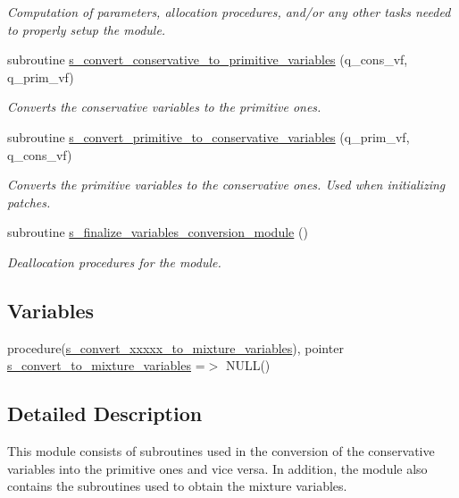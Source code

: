 \begin{DoxyCompactItemize}
\begin{DoxyCompactList}\small\item\em Computation of parameters, allocation procedures, and/or any other tasks needed to properly setup the module. \end{DoxyCompactList}\item 
subroutine \hyperlink{namespacem__variables__conversion_a589fffc2fe084855ea9e86935f1916b1}{s\+\_\+convert\+\_\+conservative\+\_\+to\+\_\+primitive\+\_\+variables} (q\+\_\+cons\+\_\+vf, q\+\_\+prim\+\_\+vf)
\begin{DoxyCompactList}\small\item\em Converts the conservative variables to the primitive ones. \end{DoxyCompactList}\item 
subroutine \hyperlink{namespacem__variables__conversion_a63d50d6771031b79117f2aba60e0cca3}{s\+\_\+convert\+\_\+primitive\+\_\+to\+\_\+conservative\+\_\+variables} (q\+\_\+prim\+\_\+vf, q\+\_\+cons\+\_\+vf)
\begin{DoxyCompactList}\small\item\em Converts the primitive variables to the conservative ones. Used when initializing patches. \end{DoxyCompactList}\item 
subroutine \hyperlink{namespacem__variables__conversion_a16536fea4442b05b3d639881992b9058}{s\+\_\+finalize\+\_\+variables\+\_\+conversion\+\_\+module} ()
\begin{DoxyCompactList}\small\item\em Deallocation procedures for the module. \end{DoxyCompactList}\end{DoxyCompactItemize}
\subsection*{Variables}
\begin{DoxyCompactItemize}
\item 
procedure(\hyperlink{interfacem__variables__conversion_1_1s__convert__xxxxx__to__mixture__variables}{s\+\_\+convert\+\_\+xxxxx\+\_\+to\+\_\+mixture\+\_\+variables}), pointer \hyperlink{namespacem__variables__conversion_a3bd150e984abfe14c8269e759ea4cb60}{s\+\_\+convert\+\_\+to\+\_\+mixture\+\_\+variables} =$>$ N\+U\+LL()
\end{DoxyCompactItemize}


\subsection{Detailed Description}
This module consists of subroutines used in the conversion of the conservative variables into the primitive ones and vice versa. In addition, the module also contains the subroutines used to obtain the mixture variables. 

